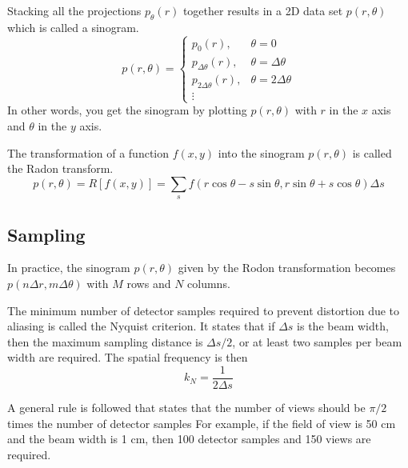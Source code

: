 \documentclass[../../../main.tex]{subfiles}
\begin{document}
Stacking all the projections $p_\theta(r)$ together results in a 2D data set $p(r,\theta)$ which is called a sinogram.
\begin{equation*}
    p(r,\theta)=\begin{cases}
        p_0(r),               & \theta=0             \\
        p_{\Delta\theta}(r),  & \theta=\Delta\theta  \\
        p_{2\Delta\theta}(r), & \theta=2\Delta\theta \\
        \vdots
    \end{cases}
\end{equation*}
In other words, you get the sinogram by plotting $p(r,\theta)$ with $r$ in the $x$ axis and $\theta$ in the $y$ axis.

The transformation of a function $f(x,y)$ into the sinogram $p(r,\theta)$ is called the Radon transform.
\begin{equation*}
    p(r,\theta)=R \left[ f(x,y) \right]=\sum_s f \left( r \cos \theta-s \sin \theta,r \sin \theta+s \cos \theta \right) \Delta s
\end{equation*}

\subsection{Sampling}
In practice, the sinogram $p(r,\theta)$ given by the Rodon transformation becomes $p(n\Delta  r,m\Delta\theta)$ with $M$ rows and $N$ columns.

The minimum number of detector samples required to prevent distortion due to aliasing is called the Nyquist criterion.
It states that if $\Delta s$ is the beam width, then the maximum sampling distance is $\Delta s/2$, or at least two samples per beam width are required.
The spatial frequency is then
\begin{equation*}
    k_N = \frac{1 }{2\Delta s}
\end{equation*}

A general rule is followed that states that the number of views should be $\pi/2$ times the number of detector samples
For example, if the field of view is 50 cm and the beam width is 1 cm, then 100 detector samples and 150 views are required.
\end{document}
